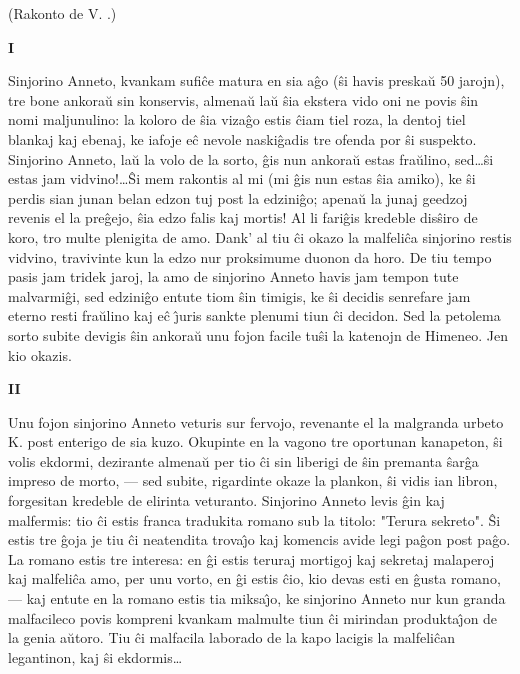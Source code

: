 \begin{center}
\footnotesize (Rakonto de V. .)
\end{center}

\begin{center}
\textbf{I}
\end{center}

   Sinjorino Anneto, kvankam sufi\^ce matura en sia a\^go (\^si havis
preska\u u 50 jarojn), tre bone ankora\u u sin konservis, almena\u u
la\u u \^sia ekstera vido oni ne povis \^sin nomi maljunulino: la
koloro de \^sia viza\^go estis \^ciam tiel roza, la dentoj tiel
blankaj kaj ebenaj, ke iafoje e\^c nevole naski\^gadis tre ofenda
por \^si suspekto. Sinjorino Anneto, la\u u la volo de la sorto,
\^gis nun ankora\u u estas fra\u ulino, sed\dots \^si estas jam
vidvino!\dots \^Si mem rakontis al mi (mi \^gis nun estas \^sia
amiko), ke \^si perdis sian junan belan edzon tuj post la
edzini\^go; apena\u u la junaj geedzoj revenis el la pre\^gejo,
\^sia edzo falis kaj mortis! Al li fari\^gis kredeble dis\^siro de
koro, tro multe plenigita de amo. Dank' al tiu \^ci okazo la
malfeli\^ca sinjorino restis vidvino, travivinte kun la edzo nur
proksimume duonon da horo. De tiu tempo pasis jam tridek jaroj, la
amo de sinjorino Anneto havis jam tempon tute malvarmi\^gi, sed
edzini\^go entute tiom \^sin timigis, ke \^si decidis senrefare jam
eterno resti fra\u ulino kaj e\^c \^{\j}uris sankte plenumi tiun
\^ci decidon. Sed la petolema sorto subite devigis \^sin ankora\u u
unu fojon facile tu\^si la katenojn de Himeneo. Jen kio okazis.

\begin{center}
\textbf{II}
\end{center}

   Unu fojon sinjorino Anneto veturis sur fervojo, revenante el la
malgranda urbeto K. post enterigo de sia kuzo. Okupinte en la vagono
tre oportunan kanapeton, \^si volis ekdormi, dezirante almena\u u
per tio \^ci sin liberigi de \^sin premanta \^sar\^ga impreso de
morto, --- sed subite, rigardinte okaze la plankon, \^si vidis ian
libron, forgesitan kredeble de elirinta veturanto. Sinjorino Anneto
levis \^gin kaj malfermis: tio \^ci estis franca tradukita romano
sub la titolo: "Terura sekreto". \^Si estis tre \^goja je tiu \^ci
neatendita trova\^{\j}o kaj komencis avide legi pa\^gon post pa\^go.
La romano estis tre interesa: en \^gi estis teruraj mortigoj kaj
sekretaj malaperoj kaj malfeli\^ca amo, per unu vorto, en \^gi estis
\^cio, kio devas esti en \^gusta romano, --- kaj entute en la romano
estis tia miksa\^{\j}o, ke sinjorino Anneto nur kun granda
malfacileco povis kompreni kvankam malmulte tiun \^ci mirindan
produkta\^{\j}on de la genia a\u utoro. Tiu \^ci malfacila laborado
de la kapo lacigis la malfeli\^can legantinon, kaj \^si
ekdormis\dots

